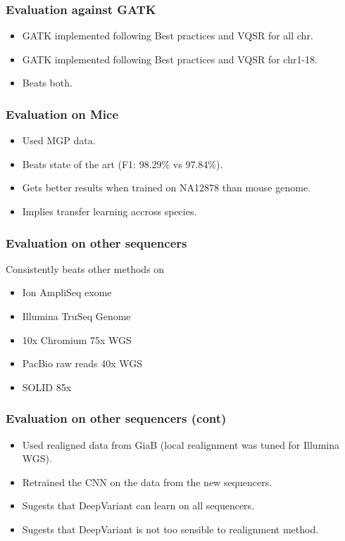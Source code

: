 \documentclass{beamer}
\begin{document}
\begin{frame}
    \frametitle{Evaluation against GATK}

    \begin{itemize}
        \item GATK implemented following Best practices and VQSR for all chr.
        \item GATK implemented following Best practices and VQSR for chr1-18.
        \item Beats both.
    \end{itemize}
\end{frame}

\begin{frame}
    \frametitle{Evaluation on Mice}

    \begin{itemize}
        \item Used MGP data.
        \item Beats state of the art (F1: 98.29\% vs 97.84\%).
        \item Gets better results when trained on NA12878 than mouse genome.
        \item Implies transfer learning accross species.
    \end{itemize}
\end{frame}

\begin{frame}
    \frametitle{Evaluation on other sequencers}

    Consistently beats other methods on
    \begin{itemize}
        \item Ion AmpliSeq exome
        \item Illumina TruSeq Genome
        \item 10x Chromium 75x WGS
        \item PacBio raw reads 40x WGS
        \item SOLID 85x
    \end{itemize}
\end{frame}

\begin{frame}
    \frametitle{Evaluation on other sequencers (cont)}

    \begin{itemize}
        \item Used realigned data from GiaB (local realignment was tuned for Illumina WGS).
        \item Retrained the CNN on the data from the new sequencers.
        \item Sugests that DeepVariant can learn on all sequencers.
        \item Sugests that DeepVariant is not too sensible to realignment method.
    \end{itemize}
\end{frame}
\end{document}
